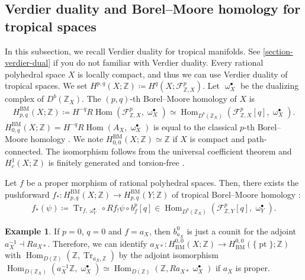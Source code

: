 \documentclass[a4paper,dvipdfmx,reqno,12pt]{amsart}
\theoremstyle{definition}
\newtheorem{example}[theorem]{Example}
\newcommand{\deq}{\coloneqq}
\newcommand{\Z}{\mathbb{Z}}%
\newcommand{\opn}[1]{\operatorname{#1}}
\numberwithin{equation}{section}
\begin{document}
\subsection{Verdier duality and Borel--Moore homology
for tropical spaces}
In this subsection, we recall Verdier duality for
tropical manifolds.
See \cref{section-verdier-dual} if you do not familiar 
with Verdier duality.
Every rational polyhedral space $X$ is locally compact, 
and thus we can use Verdier duality of tropical spaces.
We set $H^{p,q}(X;\mathbb{Z})\deq 
H^{q}(X;\mathcal{F}_{\mathbb{Z},X}^{p})$. 
Let $\upomega_X^{\bullet}$ be the dualizing complex 
of $D^{b}(\mathbb{Z}_X)$.
The $(p,q)$-th Borel--Moore homology of $X$ is
\begin{align}
H^{\opn{BM}}_{p,q}(X;\Z)\deq 
H^{-q}R\opn{Hom}(\mathcal{F}_{\mathbb{Z},X}^{p},\upomega_X^{\bullet})\simeq 
\opn{Hom}_{D^{b}(\mathbb{Z}_X)}(\mathcal{F}_{\mathbb{Z},X}^{p}[q],\upomega_X^{\bullet}).
\end{align}
$H_{0,q}^{\opn{BM}}(X;\Z)=
H^{-q}R\opn{Hom}(A_X,\upomega_X^{\bullet})$ 
is equal to the classical $p$-th Borel--Moore homology
\cite[Lemma 4.8]{gross2019sheaftheoretic}.
We note $H_{0,0}^{\opn{BM}}(X;\mathbb{Z})\simeq 
 \mathbb{Z}$ if 
$X$ is compact and path-connected.
The isomorphism follows from the universal 
coefficient theorem and 
$H^{1}_c(X;\mathbb{Z})$ is finitely generated and
torsion-free 
\cite[VI.Proposition 5.3]{iversenCohomologySheaves1986a}.

Let $f$ be a proper morphism of rational polyhedral 
spaces.
Then, there exists the pushforward
$f_*\colon H_{p,q}^{\mathrm{BM}}(X;\mathbb{Z})
\to H_{p,q}^{\mathrm{BM}}(Y;\mathbb{Z})$
of tropical Borel--Moore homology 
\cite[Definition 4.9]{gross2019sheaftheoretic}:
\begin{align}
f_*(\psi)\deq \opn{Tr}_{f,\upomega_Y^{\bullet}}\circ 
Rf_!\psi \circ b_{f}^{p}[q]\in 
\opn{Hom}_{D^{b}(\mathbb{Z}_X)}(
\mathcal{F}^{p}_{\mathbb{Z},Y}[q],\upomega_Y^{\bullet}).
\end{align}

\begin{example}

If $p=0$, $q=0$ and $f=a_X$, 
then $b^{0}_{a_X}$ is just a counit for 
the adjoint $a^{-1}_X\dashv Ra_{X*}$.
Therefore, we can identify
$a_{X*}\colon H_{\opn{BM}}^{0,0}(X;\mathbb{Z})
\to H_{\opn{BM}}^{0,0}(\{\opn{pt}\};\mathbb{Z})$
with $\opn{Hom}_{D(\mathbb{Z})}(\mathbb{Z},\opn{Tr}_{a_X,\mathbb{Z}})$
by the adjoint isomorphism
$\opn{Hom}_{D(\mathbb{Z}_X)}(a_X^{-1}\mathbb{Z},
\upomega_X^{\bullet})\simeq 
\opn{Hom}_{D(\mathbb{Z})}(\mathbb{Z},Ra_{X*}\upomega_X^{\bullet})$
if $a_X$ is proper.

\end{example}
\end{document}
